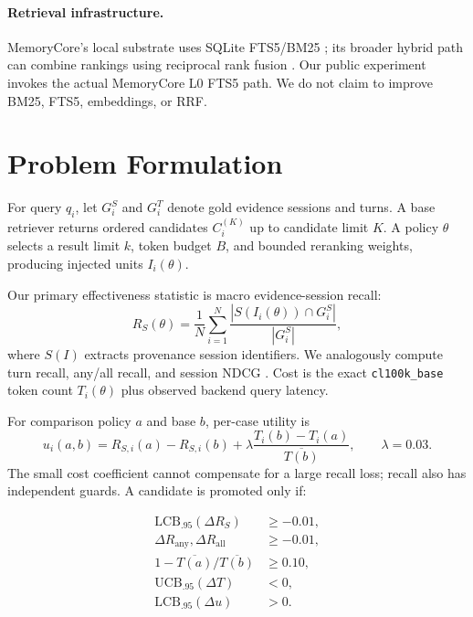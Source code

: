 \documentclass[10pt]{article}
\newcommand{\code}[1]{\texttt{#1}}
\begin{document}
\paragraph{Retrieval infrastructure.}
MemoryCore's local substrate uses SQLite FTS5/BM25
\citep{sqlitefts5}; its broader hybrid path can combine rankings using reciprocal
rank fusion \citep{cormack2009rrf}. Our public experiment invokes the actual
MemoryCore L0 FTS5 path. We do not claim to improve BM25, FTS5, embeddings, or
RRF.

\section{Problem Formulation}

For query $q_i$, let $G_i^S$ and $G_i^T$ denote gold evidence sessions and
turns. A base retriever returns ordered candidates $C_i^{(K)}$ up to candidate
limit $K$. A policy $\theta$ selects a result limit $k$, token budget $B$, and
bounded reranking weights, producing injected units $I_i(\theta)$.

Our primary effectiveness statistic is macro evidence-session recall:
\begin{equation}
  R_S(\theta) = \frac{1}{N}\sum_{i=1}^{N}
  \frac{|S(I_i(\theta)) \cap G_i^S|}{|G_i^S|},
\end{equation}
where $S(I)$ extracts provenance session identifiers. We analogously compute
turn recall, any/all recall, and session NDCG \citep{jarvelin2002ndcg}. Cost is
the exact \code{cl100k\_base} token count $T_i(\theta)$ plus observed backend
query latency.

For comparison policy $a$ and base $b$, per-case utility is
\begin{equation}
 u_i(a,b) = R_{S,i}(a)-R_{S,i}(b)
 + \lambda\frac{T_i(b)-T_i(a)}{\overline{T(b)}},
 \qquad \lambda=0.03.
\end{equation}
The small cost coefficient cannot compensate for a large recall loss; recall
also has independent guards. A candidate is promoted only if:

\begin{align}
  \mathrm{LCB}_{.95}(\Delta R_S) &\ge -0.01, \\
  \Delta R_{\mathrm{any}},\Delta R_{\mathrm{all}} &\ge -0.01, \\
  1-\overline{T(a)}/\overline{T(b)} &\ge 0.10, \\
  \mathrm{UCB}_{.95}(\Delta T) &< 0, \\
  \mathrm{LCB}_{.95}(\Delta u) &> 0.
\end{align}
\end{document}

